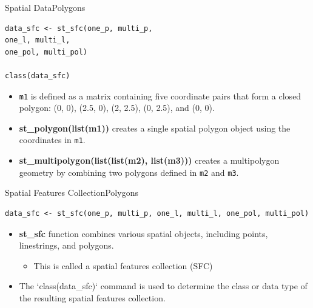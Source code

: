 \documentclass[hyperref={pdfpagelabels=false}]{beamer}
\begin{document}
\begin{frame}[fragile]{Spatial Data}{Polygons}
\begin{lstlisting}
data_sfc <- st_sfc(one_p, multi_p,
one_l, multi_l,
one_pol, multi_pol)

class(data_sfc)
\end{lstlisting}
\begin{itemize}
	\item \texttt{m1} is defined as a matrix containing five coordinate pairs that form a closed polygon: (0, 0), (2.5, 0), (2, 2.5), (0, 2.5), and (0, 0).
	\vspace{0.2cm}
	\item \textbf{st\_polygon(list(m1))} creates a single spatial polygon object using the coordinates in \texttt{m1}.
	\vspace{0.2cm}
	\item \textbf{st\_multipolygon(list(list(m2), list(m3)))} creates a multipolygon geometry by combining two polygons defined in \texttt{m2} and \texttt{m3}.
\end{itemize}
\end{frame}




\begin{frame}[fragile]{Spatial Features Collection}{Polygons}
\begin{lstlisting}
data_sfc <- st_sfc(one_p, multi_p, one_l, multi_l, one_pol, multi_pol)
\end{lstlisting}
\begin{itemize}
	\item \textbf{st\_sfc} function combines various spatial objects, including points, linestrings, and polygons.
	\vspace{0.2cm}
	\begin{itemize}
	\item This is called a spatial features collection (SFC)
\end{itemize}
		\vspace{0.2cm}
	\item The `class(data\_sfc)` command is used to determine the class or data type of the resulting spatial features collection.
\end{itemize}
\end{frame}
\end{document}
